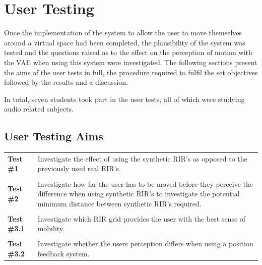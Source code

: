 \documentclass[../../main.tex]{subfiles}
\begin{document}
\section{User Testing}
	Once the implementation of the system to allow the user to move themselves around a virtual space had been completed, the plausibility of the system was tested and the questions raised as to the effect on the perception of motion with the \ac{VAE} when using this system were investigated. The following sections present the aims of the user tests in full, the procedure required to fulfil the set objectives followed by the results and a discussion.

	In total, seven students took part in the user tests, all of which were studying audio related subjects.

	\subsection{User Testing Aims}





		\begin{tabular}{l| p{}}
		
			\textbf{Test \#1} & Investigate the effect of using the synthetic \ac{RIR}'s as opposed to the previously used real \ac{RIR}'s.\\
			&\\
			\textbf{Test \#2} & Investigate how far the user has to be moved before they perceive the difference when using synthetic \ac{RIR}'s to investigate the potential minimum distance between synthetic \ac{RIR}'s required.\\
			&\\
			\textbf{Test \#3.1} & Investigate which \ac{RIR} grid provides the user with the best sense of mobility.\\
			&\\
			\textbf{Test \#3.2} &  Investigate whether the users perception differs when using a position feedback system.
			\end{tabular}
\end{document}
